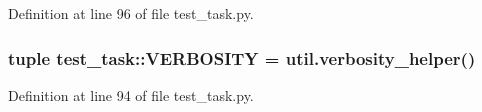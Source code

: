 \-Definition at line 96 of file test\-\_\-task.\-py.

\hypertarget{namespacetest__task_a3620273808c2b578016e9b302ad3a301}{
\subsubsection[{\-V\-E\-R\-B\-O\-S\-I\-T\-Y}]{\setlength{\rightskip}{0pt plus 5cm}tuple {\bf test\-\_\-task\-::\-V\-E\-R\-B\-O\-S\-I\-T\-Y} = util.\-verbosity\-\_\-helper()}}
\label{namespacetest__task_a3620273808c2b578016e9b302ad3a301}


\-Definition at line 94 of file test\-\_\-task.\-py.

